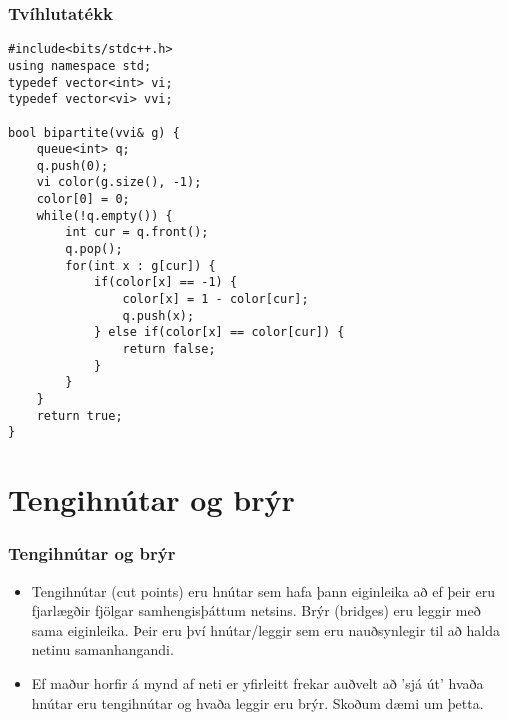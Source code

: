 \documentclass{beamer}
\begin{document}
\begin{frame}[fragile]
\frametitle{Tvíhlutatékk}

\begin{scriptsize}
\begin{verbatim}
#include<bits/stdc++.h>
using namespace std;
typedef vector<int> vi;
typedef vector<vi> vvi;

bool bipartite(vvi& g) {
    queue<int> q;
    q.push(0);
    vi color(g.size(), -1);
    color[0] = 0;
    while(!q.empty()) {
        int cur = q.front();
        q.pop();
        for(int x : g[cur]) {
            if(color[x] == -1) {
                color[x] = 1 - color[cur];
                q.push(x);
            } else if(color[x] == color[cur]) {
                return false;
            }
        }
    }
    return true;
}
\end{verbatim}
\end{scriptsize}

\end{frame}

\section[Tengihnútar og brýr]{Tengihnútar og brýr}

\begin{frame}
\frametitle{Tengihnútar og brýr}

\begin{itemize}

\item<1-> Tengihnútar (cut points) eru hnútar sem hafa þann eiginleika að ef þeir eru fjarlægðir fjölgar samhengisþáttum netsins. Brýr (bridges) eru leggir með sama eiginleika. Þeir eru því hnútar/leggir sem eru nauðsynlegir til að halda netinu samanhangandi.

\item<2-> Ef maður horfir á mynd af neti er yfirleitt frekar auðvelt að 'sjá út' hvaða hnútar eru tengihnútar og hvaða leggir eru brýr. Skoðum dæmi um þetta.

\end{itemize}

\end{frame}
\end{document}
